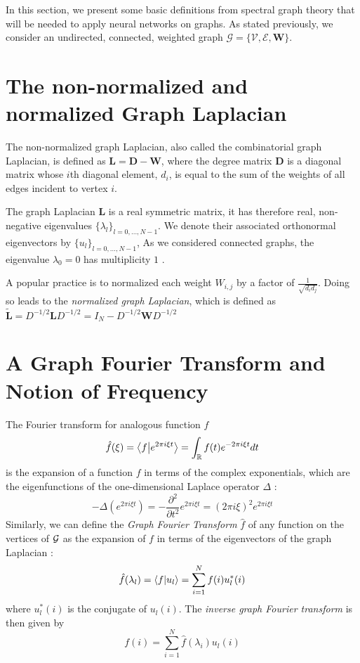 \documentclass[sigconf]{acmart}
\begin{document}
In this section, we present some basic definitions from spectral graph theory that will be needed to apply neural networks on graphs. As stated previously, we consider an undirected, connected, weighted graph $\mathcal{G} = \{\mathcal{V}, \mathcal{E}, \mathbf{W}\}$. 

\section{The non-normalized and normalized Graph Laplacian}
The non-normalized graph Laplacian, also called the combinatorial graph Laplacian, is defined as $\mathbf{L} = \mathbf{D}-\mathbf{W}$, where the degree matrix $\mathbf{D}$ is a diagonal matrix whose $i$th diagonal element, $d_i$, is equal to the sum of the weights of all edges incident to vertex $i$.

The graph Laplacian $\mathbf{L}$ is a real symmetric matrix, it has therefore real, non-negative eigenvalues $\{\lambda_l\}_{l=0, \dots, N-1}$. We denote their associated  orthonormal eigenvectors by $\{u_l\}_{l=0,\dots, N-1}$, %
As we considered connected graphs, the eigenvalue $\lambda_0=0$ has multiplicity $1$  \cite{shuman_emerging_2013}.

A popular practice is to normalized each weight $W_{i, j}$ by a factor of $\frac{1}{\sqrt{d_id_j}}$. Doing so leads to the \textit{normalized graph Laplacian}, which is defined as $\tilde{\mathbf{L}} = D^{-1/2}\mathbf{L}D^{-1/2} = I_N - D^{-1/2}\mathbf{W}D^{-1/2}$


\section{A Graph Fourier Transform and Notion of Frequency}
The Fourier transform for analogous function $f$
$$
\hat{f}(\xi) = \left \langle f \middle| e^{2\pi i\xi t} \right \rangle = \int_{\mathbb{R}} f(t)e^{-2\pi i \xi t}dt
$$
is the expansion of a function $f$ in terms of the complex exponentials, which are the eigenfunctions of the one-dimensional Laplace operator $\Delta$ :
$$
-\Delta (e^{2\pi i \xi t}) = -\frac{\partial^2}{\partial t^2} e^{2\pi i \xi t} = (2\pi i\xi)^2 e^{2\pi i \xi t}
$$
Similarly, we can define the \textit{Graph Fourier Transform} $\hat{f}$ of any function on the vertices of $\mathcal{G}$ as the expansion of $f$ in terms of the eigenvectors of the graph Laplacian :
\begin{equation}
    \hat{f}(\lambda_l) = \left \langle f \middle| u_l \right \rangle = \sum_{i=1}^{N} f(i)u_l^*(i)
\end{equation}
where $u_l^*(i)$ is the conjugate of $u_l(i)$.
The \textit{inverse graph Fourier transform} is then given by 
\begin{equation}
    f(i) = \sum_{i=1}^{N} \hat{f}(\lambda_i)u_l(i)
\end{equation}
\end{document}
